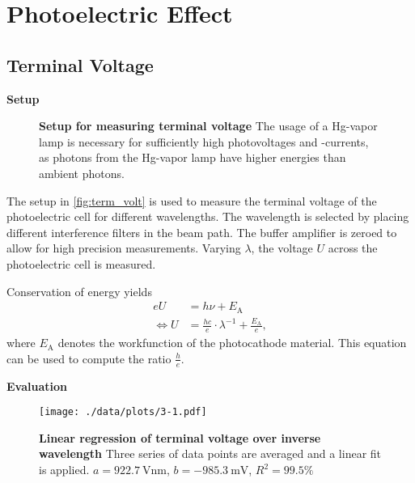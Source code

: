 \chapter{Photoelectric Effect}


\section{Terminal Voltage}%

\textbf{Setup}\\
\begin{figure}[tbp]
	\centering
	\caption[Setup for measuring terminal voltage]{\textbf{Setup for measuring terminal voltage} The usage of a Hg-vapor lamp is necessary for sufficiently high photovoltages and -currents, as photons from the Hg-vapor lamp have higher energies than ambient photons.}
	\label{fig:term_volt}
\end{figure}
The setup in \autoref{fig:term_volt} is used to measure the terminal voltage of the photoelectric cell for different wavelengths.
The wavelength is selected by placing different interference filters in the beam path.	%
The buffer amplifier is zeroed to allow for high precision measurements.
Varying $\lambda$, the voltage $U$ across the photoelectric cell is measured.

Conservation of energy yields
\begin{align}
	eU &= h\nu+E_\text{A} \nonumber \\
	\Leftrightarrow U &= \frac{hc}{e}\cdot\lambda^{-1}+\frac{E_\text{A}}{e}, \label{eq:energy_balance}
\end{align}
where $E_\text{A}$ denotes the workfunction of the photocathode material.
This equation can be used to compute the ratio $\frac{h}{e}$.

\textbf{Evaluation}\\
\begin{figure}[tbp]
	\centering
	\texttt{[image: ./data/plots/3-1.pdf]}
	\caption[Linear regression of terminal voltage over inverse wavelength]{\textbf{Linear regression of terminal voltage over inverse wavelength} Three series of data points are averaged and a linear fit is applied. $a=\SI{922.7}{\volt\nm}$, $b=\SI{-985.3}{\milli\V}$, $R^2=99.5\%$}
	\label{fig:linreg_term_volt}
\end{figure}

